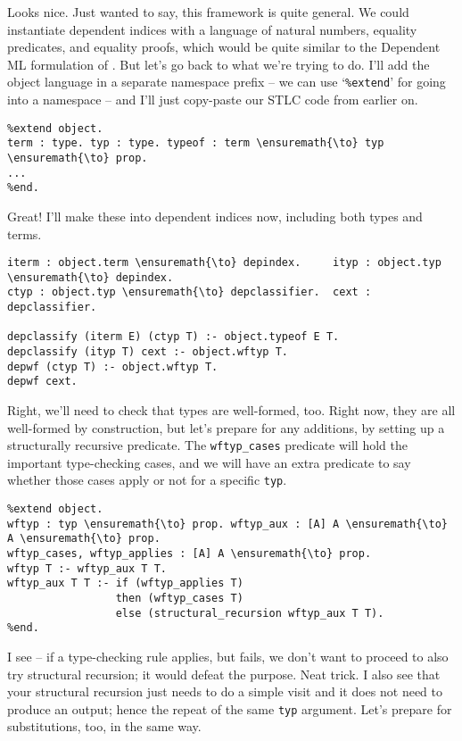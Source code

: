 \heroADVISOR{} Looks nice. Just wanted to say, this framework is quite
general. We could instantiate dependent indices with a language of
natural numbers, equality predicates, and equality proofs, which would
be quite similar to the Dependent ML formulation of
\citet{licata2005formulation}. But let's go back to what we're trying to
do. I'll add the object language in a separate namespace prefix -- we
can use `\texttt{\%extend}' for going into a namespace -- and I'll just
copy-paste our STLC code from earlier on.

\begin{verbatim}
%extend object.
term : type. typ : type. typeof : term \ensuremath{\to} typ \ensuremath{\to} prop.
...
%end.
\end{verbatim}

\heroSTUDENT{} Great! I'll make these into dependent indices now, including
both types and terms.

\begin{verbatim}
iterm : object.term \ensuremath{\to} depindex.     ityp : object.typ \ensuremath{\to} depindex.
ctyp : object.typ \ensuremath{\to} depclassifier.  cext : depclassifier.

depclassify (iterm E) (ctyp T) :- object.typeof E T.
depclassify (ityp T) cext :- object.wftyp T.
depwf (ctyp T) :- object.wftyp T.
depwf cext.
\end{verbatim}

\heroADVISOR{} Right, we'll need to check that types are well-formed, too.
Right now, they are all well-formed by construction, but let's prepare
for any additions, by setting up a structurally recursive predicate. The
\texttt{wftyp\_cases} predicate will hold the important type-checking
cases, and we will have an extra predicate to say whether those cases
apply or not for a specific \texttt{typ}.

\begin{verbatim}
%extend object.
wftyp : typ \ensuremath{\to} prop. wftyp_aux : [A] A \ensuremath{\to} A \ensuremath{\to} prop.
wftyp_cases, wftyp_applies : [A] A \ensuremath{\to} prop.
wftyp T :- wftyp_aux T T.
wftyp_aux T T :- if (wftyp_applies T)
                 then (wftyp_cases T)
                 else (structural_recursion wftyp_aux T T).
%end.
\end{verbatim}

\heroSTUDENT{} I see -- if a type-checking rule applies, but fails, we don't
want to proceed to also try structural recursion; it would defeat the
purpose. Neat trick. I also see that your structural recursion just
needs to do a simple visit and it does not need to produce an output;
hence the repeat of the same \texttt{typ} argument. Let's prepare for
substitutions, too, in the same way.

